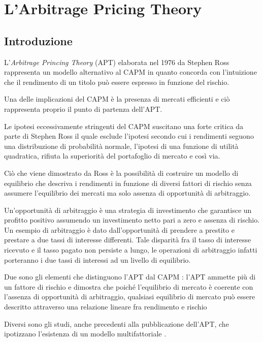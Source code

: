 \section{L'Arbitrage Pricing Theory}
\subsection{Introduzione}


L'\textit{Arbitrage Princing Theory} (APT) elaborata nel 1976 da Stephen Ross rappresenta un modello alternativo al CAPM \cite{ross_arbitrage_2013} in quanto concorda con l'intuizione che il rendimento di un titolo può essere espresso in funzione del rischio. 

Una delle implicazioni del CAPM è la presenza di mercati efficienti e ciò rappresenta proprio il punto di partenza dell'APT. 

Le ipotesi eccessivamente stringenti del CAPM suscitano una forte critica da parte di Stephen Ross il quale esclude l'ipotesi secondo cui i rendimenti seguono una distribuzione di probabilità normale, l'ipotesi di una funzione di utilità quadratica, rifiuta la superiorità del portafoglio di mercato e così via. 

Ciò che viene dimostrato da Ross è la possibilità di costruire un modello di equilibrio che descriva i rendimenti in funzione di diversi fattori di rischio senza assumere l'equilibrio dei mercati ma solo assenza di opportunità di arbitraggio.

Un'opportunità di arbitraggio \cite{dybvig_arbitrage_1989} è una strategia di investimento che garantisce un profitto positivo assumendo un investimento netto pari a zero e assenza di rischio. Un esempio di arbitraggio è dato dall'opportunità di prendere a prestito e prestare a due tassi di interesse differenti. Tale disparità fra il tasso di interesse ricevuto e il tasso pagato non persiste a lungo, le operazioni di arbitraggio infatti porteranno i due tassi di interessi ad un livello di equilibrio.  

Due sono gli elementi che distinguono l'APT dal CAPM \cite{ross_return_1973}: l'APT ammette più di un fattore di rischio e dimostra che poiché l'equilibrio di mercato è coerente con l'assenza di opportunità di arbitraggio, qualsiasi equilibrio di mercato può essere descritto attraverso una relazione lineare fra rendimento e rischio 

Diversi sono gli studi, anche precedenti alla pubblicazione dell'APT, che ipotizzano l'esistenza di un modello multifattoriale \cite{roll_empirical_1980}. 

